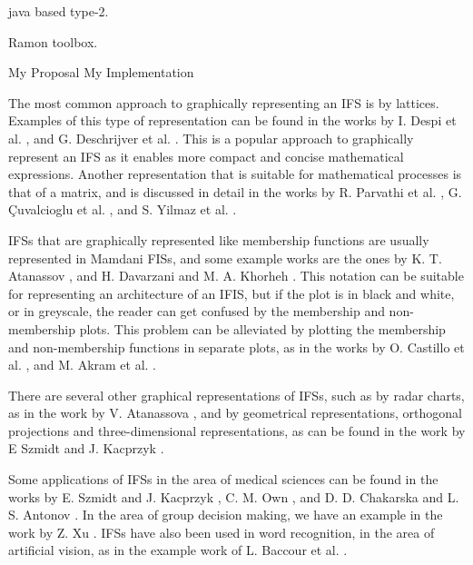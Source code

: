 \cite{Wagner2013} java based type-2.

\cite{castro2007interval} Ramon toolbox.

\cite{Hernandez-aguila2016} My Proposal \cite{Hernandez-Aguila2017} My
Implementation


The most common approach to graphically representing an IFS is by
lattices. Examples of this type of representation can be found in the works by
I. Despi et al. \cite{Despi2013}, and G. Deschrijver et
al. \cite{Deschrijver2004}. This is a popular approach to graphically represent
an IFS as it enables more compact and concise mathematical expressions. Another
representation that is suitable for mathematical processes is that of a matrix,
and is discussed in detail in the works by R. Parvathi et
al. \cite{Parvathi2014}, G. Çuvalcioglu et al. \cite{Yilmaz2015}, and S. Yilmaz
et al. \cite{Yilmaz2015a}.

IFSs that are graphically represented like membership functions are usually
represented in Mamdani FISs, and some example works are the ones by
K. T. Atanassov \cite{Atanassov1986}, and H. Davarzani and M. A. Khorheh
\cite{Davarzani2013}. This notation can be suitable for representing an
architecture of an IFIS, but if the plot is in black and white, or in greyscale,
the reader can get confused by the membership and non-membership plots. This
problem can be alleviated by plotting the membership and non-membership
functions in separate plots, as in the works by O. Castillo et
al. \cite{castillo2007intuitionistic}, and M. Akram et al. \cite{Akram2014}.

There are several other graphical representations of IFSs, such as by radar
charts, as in the work by V. Atanassova \cite{Atanassova2010}, and by
geometrical representations, orthogonal projections and three-dimensional
representations, as can be found in the work by E Szmidt and J. Kacprzyk
\cite{Szmidt2000}.

Some applications of IFSs in the area of medical sciences can be found in the
works by E. Szmidt and J. Kacprzyk \cite{Szmidt2001}, C. M. Own \cite{Own2009},
and D. D. Chakarska and L. S. Antonov \cite{Antonov1995}. In the area of group
decision making, we have an example in the work by Z. Xu \cite{Xu2007}. IFSs
have also been used in word recognition, in the area of artificial vision, as in
the example work of L. Baccour et al. \cite{Baccour2008}.

